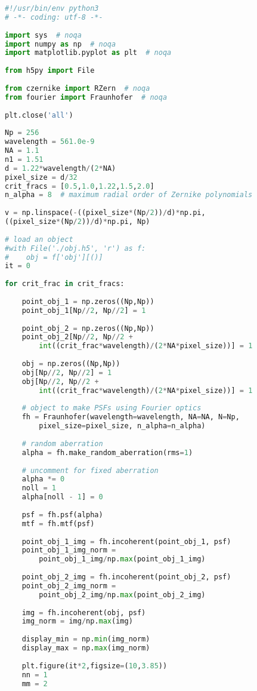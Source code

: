\begin{lstlisting}[language=Python]
#!/usr/bin/env python3
# -*- coding: utf-8 -*-
	
import sys  # noqa
import numpy as np  # noqa
import matplotlib.pyplot as plt  # noqa
	
from h5py import File
	
from czernike import RZern  # noqa
from fourier import Fraunhofer  # noqa
	
plt.close('all')
	
Np = 256
wavelength = 561.0e-9
NA = 1.1
n1 = 1.51
d = 1.22*wavelength/(2*NA)
pixel_size = d/32
crit_fracs = [0.5,1.0,1.22,1.5,2.0]
n_alpha = 8  # maximum radial order of Zernike polynomials
	
v = np.linspace(-((pixel_size*(Np/2))/d)*np.pi,
((pixel_size*(Np/2))/d)*np.pi, Np)
	
# load an object
#with File('./obj.h5', 'r') as f:
#    obj = f['obj'][()]
it = 0
	
for crit_frac in crit_fracs:
	
	point_obj_1 = np.zeros((Np,Np))
	point_obj_1[Np//2, Np//2] = 1
	
	point_obj_2 = np.zeros((Np,Np))
	point_obj_2[Np//2, Np//2 + 
		int((crit_frac*wavelength)/(2*NA*pixel_size))] = 1
	
	obj = np.zeros((Np,Np))
	obj[Np//2, Np//2] = 1
	obj[Np//2, Np//2 + 
		int((crit_frac*wavelength)/(2*NA*pixel_size))] = 1
	
	# object to make PSFs using Fourier optics
	fh = Fraunhofer(wavelength=wavelength, NA=NA, N=Np,
		pixel_size=pixel_size, n_alpha=n_alpha)
	
	# random aberration
	alpha = fh.make_random_aberration(rms=1)
	
	# uncomment for fixed aberration
	alpha *= 0
	noll = 1
	alpha[noll - 1] = 0
	
	psf = fh.psf(alpha)
	mtf = fh.mtf(psf)
	
	point_obj_1_img = fh.incoherent(point_obj_1, psf)
	point_obj_1_img_norm = 
		point_obj_1_img/np.max(point_obj_1_img)
	
	point_obj_2_img = fh.incoherent(point_obj_2, psf)
	point_obj_2_img_norm = 
		point_obj_2_img/np.max(point_obj_2_img)
	
	img = fh.incoherent(obj, psf)
	img_norm = img/np.max(img)
	
	display_min = np.min(img_norm)
	display_max = np.max(img_norm)
	
	plt.figure(it*2,figsize=(10,3.85))
	nn = 1
	mm = 2
	

\end{lstlisting}
